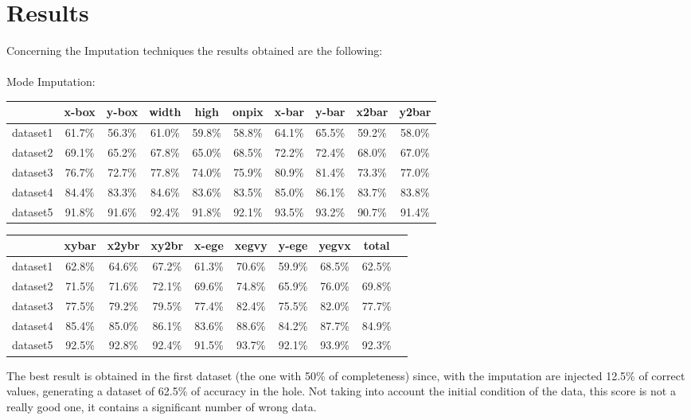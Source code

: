 \documentclass{article}
\begin{document}
\section{Results}
Concerning the Imputation techniques the results obtained are the following:\\\\
Mode Imputation:
\begin{center}
    \begin{table}[h]
\begin{tabular}{|c|c|c|c|c|c|c|c|c|c|}
\hline
 & x-box & y-box & width & high & onpix & x-bar & y-bar & x2bar & y2bar \\ \hline
dataset1 & 61.7\% & 56.3\% & 61.0\% & 59.8\% & 58.8\% & 64.1\% & 65.5\% & 59.2\% & 58.0\% \\ \hline
dataset2 & 69.1\% & 65.2\% & 67.8\% & 65.0\% & 68.5\% & 72.2\% & 72.4\% & 68.0\% & 67.0\% \\ \hline
dataset3 & 76.7\% & 72.7\% & 77.8\% & 74.0\% & 75.9\% & 80.9\% & 81.4\% & 73.3\% & 77.0\% \\ \hline
dataset4 & 84.4\% & 83.3\% & 84.6\% & 83.6\% & 83.5\% & 85.0\% & 86.1\% & 83.7\% & 83.8\% \\ \hline
dataset5 & 91.8\% & 91.6\% & 92.4\% & 91.8\% & 92.1\% & 93.5\% & 93.2\% & 90.7\% & 91.4\% \\ \hline
\end{tabular}
\end{table}

\begin{table}[h]
\begin{tabular}{|c|c|c|c|c|c|c|c|c|c|}
\hline
 & xybar & x2ybr & xy2br & x-ege & xegvy & y-ege & yegvx & total \\ \hline
dataset1 & 62.8\% & 64.6\% & 67.2\% & 61.3\% & 70.6\% & 59.9\% & 68.5\% & 62.5\% \\ \hline
dataset2 & 71.5\% & 71.6\% & 72.1\% & 69.6\% & 74.8\% & 65.9\% & 76.0\% & 69.8\% \\ \hline
dataset3 & 77.5\% & 79.2\% & 79.5\% & 77.4\% & 82.4\% & 75.5\% & 82.0\% & 77.7\% \\ \hline
dataset4 & 85.4\% & 85.0\% & 86.1\% & 83.6\% & 88.6\% & 84.2\% & 87.7\% & 84.9\% \\ \hline
dataset5 & 92.5\% & 92.8\% & 92.4\% & 91.5\% & 93.7\% & 92.1\% & 93.9\% & 92.3\% \\ \hline
\end{tabular}
\end{table}
\end{center}
The best result is obtained in the first dataset (the one with 50\% of completeness) since, with the imputation are injected 12.5\% of correct values, generating a dataset of 62.5\% of accuracy in the hole. Not taking into account the initial condition of the data, this score is not a really good one, it contains a significant number of wrong data.\\\\
\end{document}
